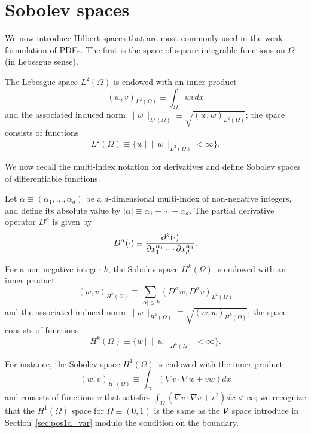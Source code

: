 \section{Sobolev spaces}
We now introduce Hilbert spaces that are most commonly used in the weak formulation of PDEs.  The first is the space of square integrable functions on $\Omega$ (in Lebesgue sense).
\begin{definition}
  The Lebesgue space $L^2(\Omega)$ is endowed with an inner product
  \begin{equation*}
    (w,v)_{L^2(\Omega)} \equiv \int_\Omega w v dx
  \end{equation*}
  and the associated induced norm $\| w \|_{L^2(\Omega)} \equiv \sqrt{(w,w)_{L^2(\Omega)}}$; the space consists of functions
  \begin{equation*}
    L^2(\Omega) \equiv \{ w \ | \ \| w \|_{L^2(\Omega)} < \infty \}.
  \end{equation*}
\end{definition}
We now recall the multi-index notation for derivatives and define Sobolev spaces of differentiable functions.
\begin{definition}
  Let $\alpha \equiv (\alpha_1, \dots, \alpha_d)$ be a $d$-dimensional multi-index of non-negative integers, and define its absolute value by $|\alpha| \equiv \alpha_1 + \cdots + \alpha_d$. The partial derivative operator $D^\alpha$ is given by 
  \begin{equation*}
    D^\alpha (\cdot)  \equiv \frac{\partial ^k (\cdot)}{\partial x_1^{\alpha_1}  \cdots \partial x_d^{\alpha_d}}.
  \end{equation*}
\end{definition}
\begin{definition}
  For a non-negative integer $k$, the Sobolev space $H^k(\Omega)$ is endowed with an inner product
  \begin{equation*}
    (w,v)_{H^k(\Omega)} \equiv \sum_{|\alpha| \leq k} (D^\alpha w, D^\alpha v)_{L^2(\Omega)}
  \end{equation*}
  and the associated induced norm $\| w \|_{H^k(\Omega)} \equiv \sqrt{(w,w)_{H^k(\Omega)}}$; the space consists of functions
  \begin{equation*}
    H^k(\Omega) \equiv \{ w \ | \ \| w \|_{H^k(\Omega)} < \infty \}.
  \end{equation*}
\end{definition}
For instance, the Sobolev space $H^1(\Omega)$ is endowed with the inner product
\begin{equation*}
  (w,v)_{H^1(\Omega)} \equiv \int_\Omega ( \nabla v \cdot \nabla w + v w ) dx
\end{equation*}
and consists of functions $v$ that satisfies $\int_\Omega (\nabla v \cdot \nabla v + v^2) dx < \infty$; we recognize that the $H^1(\Omega)$ space for $\Omega \equiv (0,1)$ is the same as the $\mathcal{V}$ space introduce in Section~\ref{sec:pos1d_var} modulo the condition on the boundary.
 
